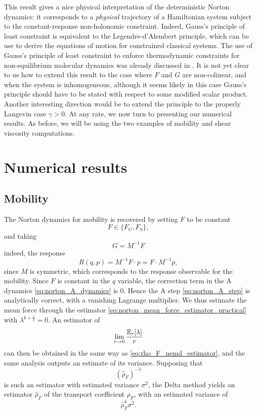 This result gives a nice physical interpretation of the deterministic Norton dynamics: it corresponds to a \textit{physical} trajectory of a Hamiltonian system subject to the constant-response non-holonomic constraint.
Indeed, Gauss's principle of least constraint \cite{G29} is equivalent to the Legendre-d'Alembert principle, which can be use to derive the equations of motion for constrained classical systems.
The use of Gauss's principle of least constraint to enforce thermodynamic constraints for non-equilibrium molecular dynamics was already discussed in \cite{EHFML83}.
It is not yet clear to us how to extend this result to the case where $F$ and $G$ are non-colinear, and when the system is inhomogeneous, although it seems likely in this case Gauss's principle should have to be stated with respect to some modified scalar product.
Another interesting direction would be to extend the principle to the properly Langevin case $\gamma>0$. At any rate, we now turn to presenting our numerical results.
As before, we will be using the two examples of mobility and shear viscosity computations.

\section{Numerical results}

\subsection{Mobility}
The Norton dynamics for mobility is recovered by setting $F$ to be constant
\[F \in \{F_{\mathrm{C}},F_{\mathrm{S}}\},\]
and taking 
\[G =M^{-1}F\]
indeed, the response
\[R(q,p) = M^{-1}F\cdot p = F\cdot M^{-1}p,\]
since $M$ is symmetric, which corresponds to the response observable for the mobility. Since $F$ is constant in the $q$ variable, the correction term in the A dynamics \eqref{eq:norton_A_dynamics} is $0$.
Hence the A step \eqref{eq:norton_A_step} is analytically correct, with a vanishing Lagrange multiplier.
 We thus estimate the mean force through the estimator \eqref{eq:norton_mean_force_estimator_practical} with $\lambda^{k+\frac12}=0$.
An estimator of \[\underset{r\to 0}{\lim}\,\frac{\mathbb{E}_r[\lambda]}{r}\] 
can then be obtained in the same way as \eqref{eq:rho_F_nemd_estimator}, and the same analysis outputs an estimate of its variance.
Supposing that $$(\widehat{\rho}_{F})^{-1}$$ is such an estimator with estimated variance $\sigma^2$, the Delta method yields an estimator 
$\widehat{\rho}_F$
of the transport coefficient $\rho_F$, with an estimated variance of
\[\widehat{\rho}_F^4\sigma^2.\]

